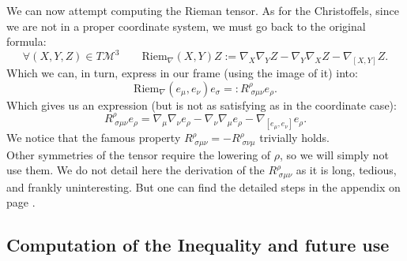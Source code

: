 \documentclass[a4paper,11pt]{article}
\numberwithin{equation}{section}
\theoremstyle{definition}
\begin{document}
We can now attempt computing the Rieman tensor. As for the Christoffels, since we are not in a proper coordinate system, we must go back to the original formula:
\begin{equation}
    \forall (X,Y,Z)\in T\mathcal{M}^3 \quad \quad \mathrm{Riem}_\nabla (X,Y)Z:= \nabla_X\nabla_YZ-\nabla_Y\nabla_XZ-\nabla_{[X,Y]}Z.
\end{equation}
Which we can, in turn, express in our frame (using the image of it) into:
\begin{equation}
\mathrm{Riem}_\nabla (e_\mu,e_\nu)e_\sigma =: R^\rho_{\;\sigma\mu\nu} e_\rho.
\end{equation}
Which gives us an expression (but is not as satisfying as in the coordinate case):
\begin{equation}\label{Riem_munu}
    R^\rho_{\;\sigma\mu\nu} e_\rho = \nabla_\mu\nabla_\nu e_\rho-\nabla_\nu\nabla_\mu e_\rho-\nabla_{[e_\mu,e_\nu]}e_\rho.
\end{equation}
We notice that the famous property $R^\rho_{\;\sigma\mu\nu}=-R^\rho_{\;\sigma\nu\mu}$ trivially holds.\\
Other symmetries of the tensor require the lowering of $\rho$, so we will simply not use them. We do not detail here the derivation of the $R^\rho_{\;\sigma\mu\nu}$ as it is long, tedious, and frankly uninteresting. But one can find the detailed steps in the appendix on page \pageref{CompR}.
\subsection{Computation of the Inequality and future use}
\end{document}
